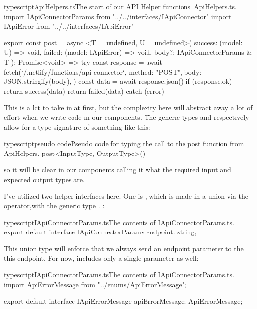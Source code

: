\documentclass[paper=6in:9in,pagesize=pdftex,headinclude=on,footinclude=on,12pt,twoside]{scrbook}
\begin{document}
\begin{codeInput}{typescript}{ApiHelpers.ts}{The start of our API Helper functions\, ApiHelpers.ts.}
import IApiConnectorParams from "../../interfaces/IApiConnector"
import IApiError from "../../interfaces/IApiError"

export const post = async <T = undefined, U = undefined>(
  success: (model: U) => void,
  failed: (model: IApiError) => void,
  body?: IApiConnectorParams & T
): Promise<void> => {
  try {
    const response = await fetch(`/.netlify/functions/api-connector`, {
      method: "POST",
      body: JSON.stringify(body),
    })
    const data = await response.json()
    if (response.ok) {
      return success(data)
    }
    return failed(data)
  } catch (error) {}
}  
\end{codeInput}

This is a lot to take in at first, but the complexity here will abstract away a lot of effort when we write code in our components. The generic types  and  respectively allow for a  type signature of something like this: 

\begin{codeInput}{typescript}{pseudo code}{Pseudo code for typing the call to the post function from ApiHelpers.}
post<InputType, OutputType>()
\end{codeInput}

so it will be clear in our components calling it what the required input and expected output types are.

I've utilized two helper interfaces here. One is , which is made in a union via the \codeword{&} operator,with the generic type . :

\begin{codeInput}{typescript}{IApiConnectorParams.ts}{The contents of IApiConnectorParams.ts.}
export default interface IApiConnectorParams {
  endpoint: string;
}
\end{codeInput}

This union type will enforce that we always send an endpoint parameter to the this endpoint. For now,  includes only a single parameter as well:

\begin{codeInput}{typescript}{IApiConnectorParams.ts}{The contents of IApiConnectorParams.ts.}
import ApiErrorMessage from "../enums/ApiErrorMessage";

export default interface IApiErrorMessage {
    apiErrorMessage: ApiErrorMessage;
}
\end{codeInput}
\end{document}
